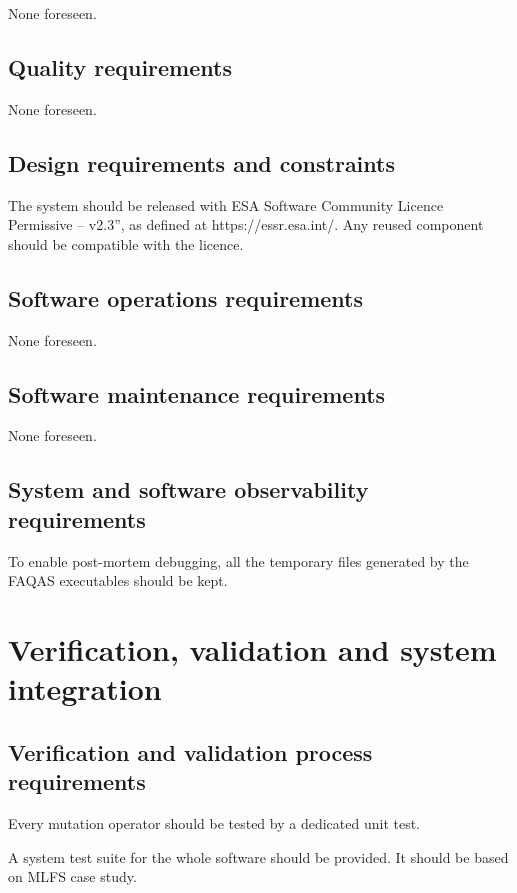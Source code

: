 None foreseen.

\subsection{Quality requirements}

None foreseen.

\subsection{Design requirements and constraints}

\RQ{} The system should be released with ESA Software Community Licence Permissive – v2.3”, as defined at https://essr.esa.int/. Any reused component should be compatible with the licence.

\subsection{Software operations requirements}

None foreseen.

\subsection{Software maintenance requirements}

None foreseen.

\subsection{System and software observability requirements}

\RQ{} To enable post-mortem debugging, all the temporary files generated by the FAQAS executables should be kept.

\section{Verification, validation and system integration}
 \subsection{Verification and validation process requirements}
 
 \RQ{} Every mutation operator should be tested by a dedicated unit test.
 
 \RQ{} A system test suite for the whole software should be provided. It should be based on MLFS case study.
 
